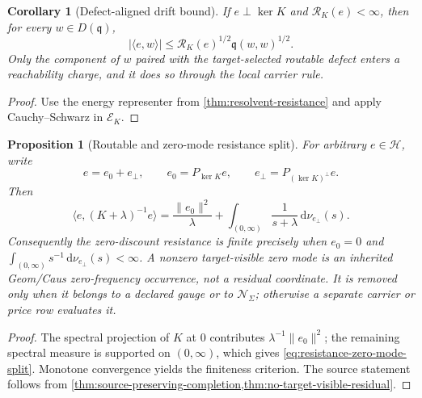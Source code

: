 \documentclass[11pt]{article}
\numberwithin{section}{part}
\theoremstyle{plain}
\newtheorem{proposition}[proposition]{Proposition}
\newtheorem{corollary}[corollary]{Corollary}
\theoremstyle{definition}
\theoremstyle{remark}
\newcommand{\dd}{\,\mathrm d}
\newcommand{\Null}{\mathscr N}
\newcommand{\Hspace}{\mathcal H}
\begin{document}
\begin{corollary}[Defect-aligned drift bound]
\label{cor:defect-aligned-drift-bound}
If \(e\perp\ker K\) and \(\mathcal R_K(e)<\infty\), then for every
\(w\in D(\mathfrak q)\),
\begin{equation}
 \label{eq:defect-aligned-drift-bound}
 |\langle e,w\rangle|
 \le\mathcal R_K(e)^{1/2}\mathfrak q(w,w)^{1/2}.
\end{equation}
Only the component of \(w\) paired with the target-selected routable defect
enters a reachability charge, and it does so through the local carrier rule.
\end{corollary}

\begin{proof}
Use the energy representer from
\cref{thm:resolvent-resistance} and apply Cauchy--Schwarz in
\(\mathcal E_K\).
\end{proof}

\begin{proposition}[Routable and zero-mode resistance split]
\label{prop:resistance-zero-mode-split}
For arbitrary \(e\in\Hspace\), write
\[
 e=e_0+e_\perp,
 \qquad
 e_0=P_{\ker K}e,
 \qquad
 e_\perp=P_{(\ker K)^\perp}e.
\]
Then
\begin{equation}
 \label{eq:resistance-zero-mode-split}
 \langle e,(K+\lambda)^{-1}e\rangle
 =\frac{\|e_0\|^2}{\lambda}
  +\int_{(0,\infty)}\frac{1}{s+\lambda}\dd\nu_{e_\perp}(s).
\end{equation}
Consequently the zero-discount resistance is finite precisely when
\(e_0=0\) and
\(\int_{(0,\infty)}s^{-1}\dd\nu_{e_\perp}(s)<\infty\).  A nonzero
target-visible zero mode is an inherited Geom/Caus zero-frequency occurrence,
not a residual coordinate.  It is removed only when it belongs to a declared
gauge or to \(\Null_\Sigma\); otherwise a separate carrier or price
row evaluates it.
\end{proposition}

\begin{proof}
The spectral projection of \(K\) at \(0\) contributes
\(\lambda^{-1}\|e_0\|^2\); the remaining spectral measure is supported on
\((0,\infty)\), which gives \eqref{eq:resistance-zero-mode-split}.  Monotone
convergence yields the finiteness criterion.  The source statement follows
from \cref{thm:source-preserving-completion,thm:no-target-visible-residual}.
\end{proof}
\end{document}
